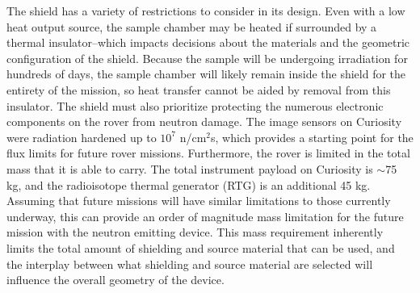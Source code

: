 \documentclass{mc2015}
\begin{document}
The shield has a variety of restrictions to consider in its design. Even with a low heat output source, the sample chamber may be heated if surrounded by a thermal insulator--which impacts decisions about the materials and the geometric configuration of the shield.  Because the sample will be undergoing irradiation for hundreds of days, the sample chamber will likely remain inside the shield for the entirety of the mission, so heat transfer cannot be aided by removal from this insulator. The shield must also prioritize protecting the numerous electronic components on the rover from neutron damage. The image sensors on Curiosity were radiation hardened up to  $10^{7}$ n/cm$^2$s, which provides a starting point for the flux limits for future rover missions. Furthermore, the rover is limited in the total mass that it is able to carry. The total instrument payload on Curiosity is $\sim$75 kg, and the radioisotope thermal generator (RTG) is an additional 45 kg. Assuming that future missions will have similar limitations to those currently underway, this can provide an order of magnitude mass limitation for the future mission with the neutron emitting device. This mass requirement inherently limits the total amount of shielding and source material that can be used, and the interplay between what shielding and source material are selected will influence the overall geometry of the device. 
\end{document}
